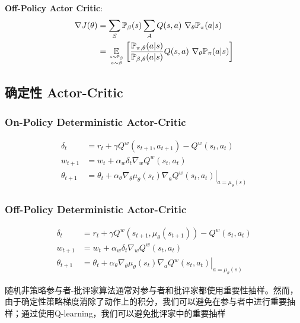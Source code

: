 \documentclass{article}
\newcommand{\env}[2]{\begin{#1}#2\end{#1}}
\begin{document}
            \textbf{Off-Policy Actor Critic}: 
                \env{align*}{
                    \nabla J(\theta) &= \sum_S  \mathbb P_\beta (s) \sum_A Q(s, a)\ \nabla_\theta \mathbb P_\pi (a | s) \\
                    &= \underset{s \sim \mathbb P_\beta \atop a \sim \beta}{\mathbb E} \left[ \frac{\mathbb P_{\pi,\theta}(a|s)}{\mathbb P_{\beta,\theta}(a|s)} Q(s, a)\ \nabla_\theta \mathbb P_\pi (a | s)\right]
                }
        
    \subsection{确定性 Actor-Critic}
        \subsubsection{On-Policy Deterministic Actor-Critic}
            \env{align*}{
                \delta_{t} &=r_{t}+\gamma Q^{w}\left(s_{t+1}, a_{t+1}\right)-Q^{w}\left(s_{t}, a_{t}\right) \\
                w_{t+1} &=w_{t}+\alpha_{w} \delta_{t} \nabla_{w} Q^{w}\left(s_{t}, a_{t}\right) \\
                \theta_{t+1} &=\theta_{t}+\left.\alpha_{\theta} \nabla_{\theta} \mu_{\theta}\left(s_{t}\right) \nabla_{a} Q^{w}\left(s_{t}, a_{t}\right)\right|_{a=\mu_{\theta}(s)}
            }
            

        
        \subsubsection{Off-Policy Deterministic Actor-Critic}
            \env{align*}{
                \delta_{t} &=r_{t}+\gamma Q^{w}\left(s_{t+1}, \mu_{\theta}\left(s_{t+1}\right)\right)-Q^{w}\left(s_{t}, a_{t}\right) \\
                w_{t+1} &=w_{t}+\alpha_{w} \delta_{t} \nabla_{w} Q^{w}\left(s_{t}, a_{t}\right) \\
                \theta_{t+1} &=\theta_{t}+\left.\alpha_{\theta} \nabla_{\theta} \mu_{\theta}\left(s_{t}\right) \nabla_{a} Q^{w}\left(s_{t}, a_{t}\right)\right|_{a=\mu_{\theta}(s)}
            }
            
            随机非策略参与者-批评家算法通常对参与者和批评家都使用重要性抽样。然而，由于确定性策略梯度消除了动作上的积分，我们可以避免在参与者中进行重要抽样；通过使用Q-learning，我们可以避免批评家中的重要抽样
            
\end{document}
